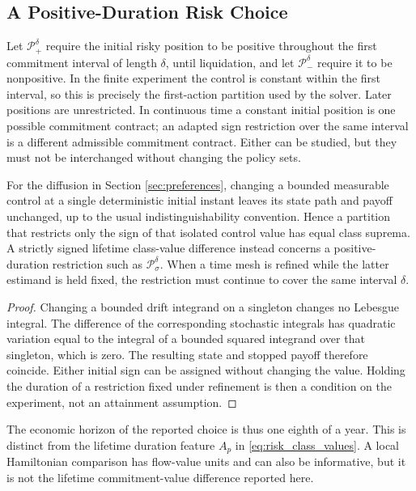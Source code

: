 \subsection{A Positive-Duration Risk Choice}
Let $\mathcal P^\delta_+$ require the initial risky position to be positive throughout the first commitment interval of length $\delta$, until liquidation, and let $\mathcal P^\delta_-$ require it to be nonpositive. In the finite experiment the control is constant within the first interval, so this is precisely the first-action partition used by the solver. Later positions are unrestricted. In continuous time a constant initial position is one possible commitment contract; an adapted sign restriction over the same interval is a different admissible commitment contract. Either can be studied, but they must not be interchanged without changing the policy sets.

\begin{proposition}
\label{prop:r8_duration}
For the diffusion in Section \ref{sec:preferences}, changing a bounded measurable control at a single deterministic initial instant leaves its state path and payoff unchanged, up to the usual indistinguishability convention. Hence a partition that restricts only the sign of that isolated control value has equal class suprema. A strictly signed lifetime class-value difference instead concerns a positive-duration restriction such as $\mathcal P^\delta_\sigma$. When a time mesh is refined while the latter estimand is held fixed, the restriction must continue to cover the same interval $\delta$.
\end{proposition}
\begin{proof}
Changing a bounded drift integrand on a singleton changes no Lebesgue integral. The difference of the corresponding stochastic integrals has quadratic variation equal to the integral of a bounded squared integrand over that singleton, which is zero. The resulting state and stopped payoff therefore coincide. Either initial sign can be assigned without changing the value. Holding the duration of a restriction fixed under refinement is then a condition on the experiment, not an attainment assumption.
\end{proof}

The economic horizon of the reported choice is thus one eighth of a year. This is distinct from the lifetime duration feature $A_p$ in \eqref{eq:risk_class_values}. A local Hamiltonian comparison has flow-value units and can also be informative, but it is not the lifetime commitment-value difference reported here.


